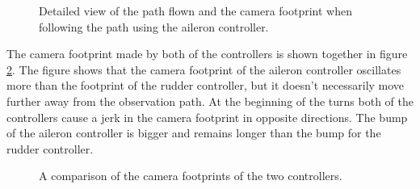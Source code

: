 \begin{figure}[]
    \centering
    \caption{Detailed view of the path flown and the camera footprint when following the path using the aileron controller.}
	\label{fig:aotc_comp_hundred}
\end{figure}

The camera footprint made by both of the controllers is shown together in figure \ref{fig:ratc_aotc_comparison}. The figure shows that the camera footprint of the aileron controller oscillates more than the footprint of the rudder controller, but it doesn't necessarily move further away from the observation path. At the beginning of the turns both of the controllers cause a jerk in the camera footprint in opposite directions. The bump of the aileron controller is bigger and remains longer than the bump for the rudder controller.

\begin{figure}[]
    \centering
    \caption{A comparison of the camera footprints of the two controllers.}
	\label{fig:ratc_aotc_comparison}
\end{figure}


